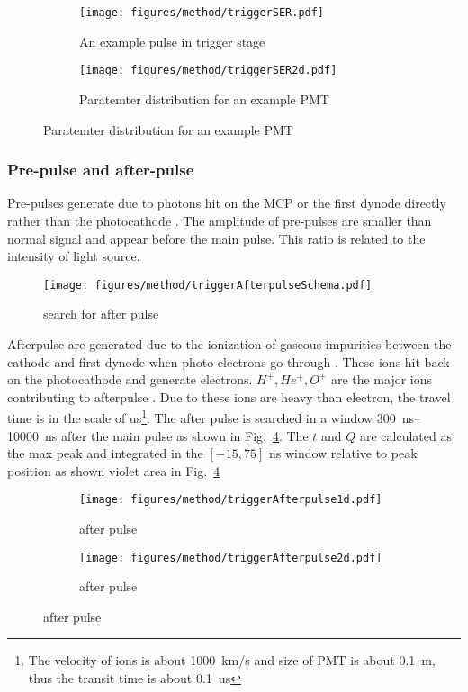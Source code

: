 \begin{figure}
    \centering
    \begin{subfigure}[t]{0.47\textwidth}
        \texttt{[image: figures/method/triggerSER.pdf]}
        \caption{An example pulse in trigger stage}
        \label{fig:triggerser}
    \end{subfigure}
    \begin{subfigure}[t]{0.47\textwidth}
        \texttt{[image: figures/method/triggerSER2d.pdf]}
        \caption{Paratemter distribution  for an example PMT}
        \label{fig:triggerser2d}
    \end{subfigure}
\end{figure}
\subsubsection{Pre-pulse and after-pulse}
Pre-pulses generate due to photons hit on the MCP or the first dynode directly rather than the photocathode \cite{JUNOMassTesting}. The amplitude of pre-pulses are smaller than normal signal and appear before the main pulse. This ratio is related to the intensity of light source.
\begin{figure}
    \centering
    \texttt{[image: figures/method/triggerAfterpulseSchema.pdf]}
    \caption{search for after pulse}
    \label{fig:afterpulseSchema}
\end{figure}

Afterpulse are generated due to the ionization of gaseous impurities between the cathode and first dynode when photo-electrons go through \cite{Coates_1973}. These ions hit back on the photocathode and generate electrons. $H^+,He^+,O^+$ are the major ions contributing to afterpulse \cite{Coates_1973}. Due to these ions are heavy than electron, the travel time is in the scale of \si{us}\footnote{The velocity of ions is about \SI{1000}{km/s} and size of PMT is about \SI{0.1}{m}, thus the transit time is about \SI{0.1}{us}}. The after pulse is searched in a window \SIrange{300}{10000}{ns} after the main pulse as shown in Fig.~\ref{fig:afterpulseSchema}. The $t$ and $Q$ are calculated as the max peak and integrated in the $[-15,75]$ ns window relative to peak position as shown violet area in Fig.~\ref{fig:afterpulseSchema}
\begin{figure}[!htbp]
    \centering
    \begin{subfigure}[t]{0.8\textwidth}
        \texttt{[image: figures/method/triggerAfterpulse1d.pdf]}
        \caption{after pulse}
        \label{fig:afterpulse1d}
    \end{subfigure}
    \begin{subfigure}[t]{0.8\textwidth}
        \texttt{[image: figures/method/triggerAfterpulse2d.pdf]}
        \caption{after pulse}
        \label{fig:afterpulse2d}
    \end{subfigure}
\end{figure}

